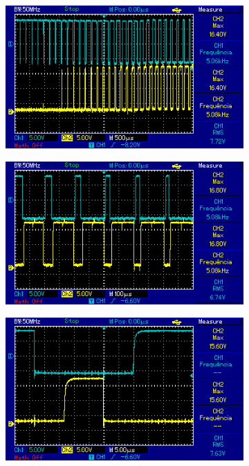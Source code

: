 \begin{figure}[!hbt]
	\centering
	\begin{subfigure}[b]{0.49\textwidth}
		\centering
		\includegraphics[width=\textwidth]{figuras/resultados_pwm1_1.png}
		\caption{}
	\end{subfigure}
	\begin{subfigure}[b]{0.49\textwidth}
		\centering
		\includegraphics[width=\textwidth]{figuras/resultados_pwm2_1.png}
		\caption{}
	\end{subfigure}
	\begin{subfigure}[b]{0.49\textwidth}
		\centering
		\includegraphics[width=\textwidth]{figuras/resultados_tempo_morto1.png}

\end{subfigure}
\end{figure}
